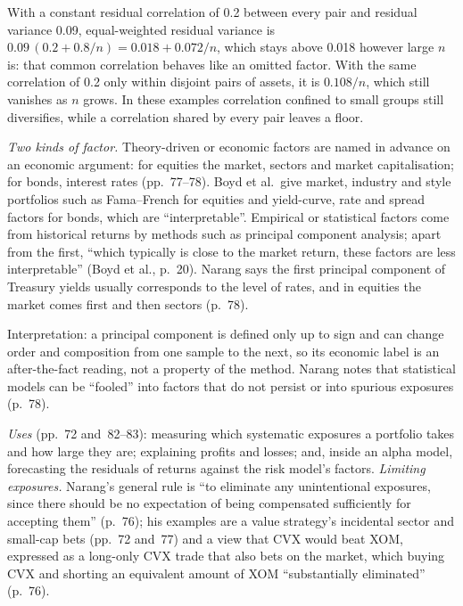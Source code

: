 \begin{qfmodel}
With a constant residual correlation of 0.2 between every pair and residual variance 0.09, equal-weighted residual variance is $0.09\,(0.2+0.8/n)=0.018+0.072/n$, which stays above 0.018 however large $n$ is: that common correlation behaves like an omitted factor. With the same correlation of 0.2 only within disjoint pairs of assets, it is $0.108/n$, which still vanishes as $n$ grows. In these examples correlation confined to small groups still diversifies, while a correlation shared by every pair leaves a floor.

\emph{Two kinds of factor.} Theory-driven or economic factors are named in advance on an economic argument: for equities the market, sectors and market capitalisation; for bonds, interest rates (pp.~77--78). Boyd et al.\ give market, industry and style portfolios such as Fama--French for equities and yield-curve, rate and spread factors for bonds, which are ``interpretable''. Empirical or statistical factors come from historical returns by methods such as principal component analysis; apart from the first, ``which typically is close to the market return, these factors are less interpretable'' (Boyd et al., p.~20). Narang says the first principal component of Treasury yields usually corresponds to the level of rates, and in equities the market comes first and then sectors (p.~78).

Interpretation: a principal component is defined only up to sign and can change order and composition from one sample to the next, so its economic label is an after-the-fact reading, not a property of the method. Narang notes that statistical models can be ``fooled'' into factors that do not persist or into spurious exposures (p.~78).

 \emph{Uses} (pp.~72 and~82--83): measuring which systematic exposures a portfolio takes and how large they are; explaining profits and losses; and, inside an alpha model, forecasting the residuals of returns against the risk model's factors. \emph{Limiting exposures.} Narang's general rule is ``to eliminate any unintentional exposures, since there should be no expectation of being compensated sufficiently for accepting them'' (p.~76); his examples are a value strategy's incidental sector and small-cap bets (pp.~72 and~77) and a view that CVX would beat XOM, expressed as a long-only CVX trade that also bets on the market, which buying CVX and shorting an equivalent amount of XOM ``substantially eliminated'' (p.~76).


\end{qfmodel}
